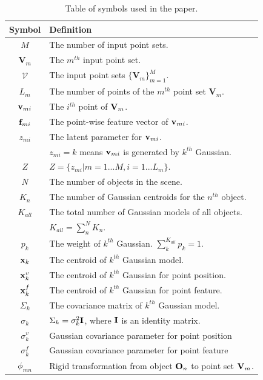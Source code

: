 \begin{table}[!hbp]
\centering
\caption{Table of symbols used in the paper.} 
\label{tab:symbol}
\begin{tabular}{c|l}
\hline
Symbol         & Definition\\
\hline
$M$            & The number of input point sets.\\
$\mathbf{V}_m$ & The $m^{th}$ input point set.\\
$\mathcal{V}$   & The input point sets $\{\mathbf{V}_m\}^{M}_{m=1}$.\\
$L_m$          & The number of points of the $m^{th}$ point set $\mathbf{V}_m$.\\
$\mathbf{v}_{mi}$  & The $i^{th}$ point of $\mathbf{V}_m$.\\
$\mathbf{f}_{mi}$   & The point-wise feature vector of $\mathbf{v}_{mi}$.\\
$z_{mi}$       & The latent parameter for $\mathbf{v}_{mi}$.\\
               & $z_{mi}=k$ means $\mathbf{v}_{mi}$ is generated by $k^{th}$ Gaussian. \\
$Z$            & $Z=\{z_{mi}|m=1...M,i=1...L_m\}$.\\
$N$            & The number of objects in the scene.\\
$K_n$          & The number of Gaussian centroids for the $n^{th}$ object. \\
$K_{all}$      & The total number of Gaussian models of all objects. \\
               & $K_{all} = \sum_n^N K_n $.\\
$p_k$          & The weight of $k^{th}$ Gaussian. $\sum_k^{K_{all}}p_k=1$.\\
$\mathbf{x}_k$      & The centroid of $k^{th}$ Gaussian model.\\
$\mathbf{x}^{v}_k$   & The centroid of $k^{th}$ Gaussian for point position.\\
$\mathbf{x}^{f}_k$   & The centroid of $k^{th}$ Gaussian for point feature.\\
$\Sigma_k$     & The covariance matrix of $k^{th}$ Gaussian model.\\
$\sigma_k$     & $\Sigma_k=\sigma_k^2\mathbf{I}$, where $\mathbf{I}$ is an identity matrix.\\
$\sigma^v_k$   & Gaussian covariance parameter for point position\\
$\sigma^f_k$   & Gaussian covariance parameter for point feature\\
$\phi_{mn}$    & Rigid transformation from object $\mathbf{O}_n$ to point set $\mathbf{V}_m$.\\
\hline
\end{tabular}
\end{table}
